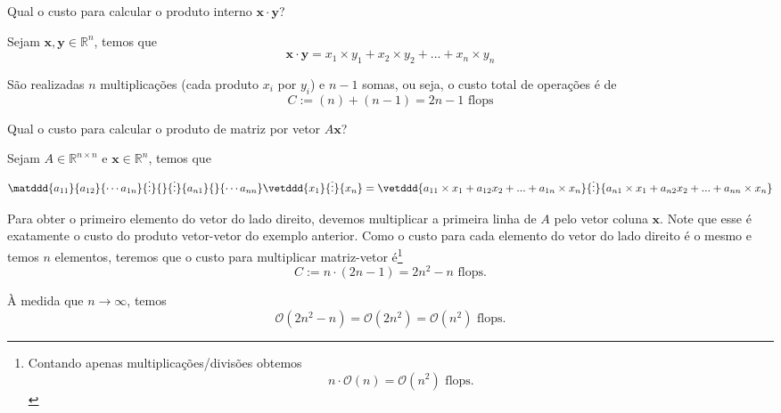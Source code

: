 \begin{ex}
Qual o custo para calcular o produto interno $\pmb{x}\cdot\pmb{y}$?
\end{ex}
\begin{sol}
Sejam $\pmb{x}, \pmb{y} \in \mathbb{R}^n$, temos que
\begin{equation}
  \pmb{x}\cdot\pmb{y} = x_1 \times y_1 + x_2\times y_2 + ... +x_n\times y_n
\end{equation}

São realizadas $n$ multiplicações (cada produto $x_i$ por $y_i$) e $n-1$ somas, ou seja, o custo total de operações é de
\begin{equation}
  C := (n)+(n-1) = 2n-1 \text{~flops}
\end{equation}
\end{sol}


\begin{ex}
Qual o custo para calcular o produto de matriz por vetor $A \pmb{x}$?
\end{ex}
\begin{sol}
 Sejam $A \in \mathbb{R}^{n\times n}$ e $\pmb{x} \in \mathbb{R}^n$, temos que
\begin{equation}
  \matddd{a_{11}}{a_{12}}{\cdots a_{1n}}{\vdots}{}{\vdots}{a_{n1}}{}{\cdots a_{nn}} \vetddd{x_1}{\vdots }{x_n}
  =\vetddd{ a_{11}\times x_1 + a_{12}x_2 +...+a_{1n}\times x_n }{\vdots }{a_{n1}\times x_1 + a_{n2}x_2 +...+a_{nn}\times x_n}
\end{equation}

Para obter o primeiro elemento do vetor do lado direito, devemos multiplicar a  primeira linha de $A$ pelo vetor coluna $\pmb{x}$. Note que esse é exatamente o custo do produto vetor-vetor do exemplo anterior. Como o custo para cada elemento do vetor do lado direito é o mesmo e temos $n$ elementos, teremos que o custo para multiplicar matriz-vetor é\footnote{Contando apenas multiplicações/divisões obtemos
\begin{equation}
  n\cdot \mathcal{O}(n) = \mathcal{O}(n^2) \text{~flops.}
\end{equation}
}
\begin{equation}
  C:=n \cdot ( 2n-1) = 2n^2-n \text{~flops}.
\end{equation}

À medida que $n \rightarrow \infty$, temos
\begin{equation}
  \mathcal{O}(2n^2-n) =\mathcal{O}(2n^2)=\mathcal{O}(n^2) \text{~flops.}
\end{equation}

\end{sol}

